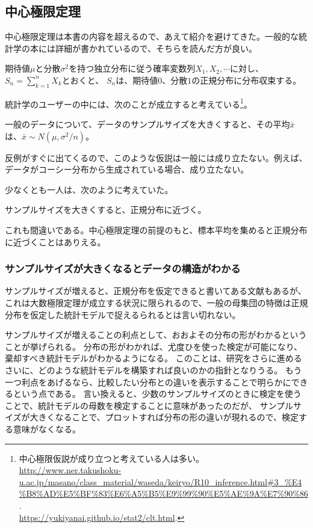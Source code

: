 

\subsection{中心極限定理}
中心極限定理は本書の内容を超えるので、あえて紹介を避けてきた。一般的な統計学の本には詳細が書かれているので、そちらを読んだ方が良い。
\begin{theo}[中心極限定理]
    期待値$\mu$と分散$\sigma^2$を持つ独立分布に従う確率変数列$X_1,X_2,\cdots$に対し、$S_n=\sum_{k=1}^nX_k$とおくと、
    $S_n$は、期待値$0$、分散$1$の正規分布に分布収束する。
\end{theo}

統計学のユーザーの中には、次のことが成立すると考えている\footnote{
    中心極限仮説が成り立つと考えている人は多い。
    \\ \url{http://www.ner.takushoku-u.ac.jp/masano/class_material/waseda/keiryo/R10_inference.html#3_%E4%B8%AD%E5%BF%83%E6%A5%B5%E9%99%90%E5%AE%9A%E7%90%86} .
    \\ \url{https://yukiyanai.github.io/stat2/clt.html}.
    }。
\begin{hypoth}[中心極限仮説]
    一般のデータについて、データのサンプルサイズを大きくすると、その平均$\bar{x}$は、$\bar{x}\sim N(\mu,\sigma^2/n)$。
\end{hypoth}
反例がすぐに出てくるので、このような仮説は一般には成り立たない。例えば、データがコーシー分布から生成されている場合、成り立たない。

少なくとも一人は、次のように考えていた。
\begin{hypoth}[中心極限仮説2]
    サンプルサイズを大きくすると、正規分布に近づく。
\end{hypoth}
これも間違いである。中心極限定理の前提のもと、標本平均を集めると正規分布に近づくことはありえる。


\subsubsection{ サンプルサイズが大きくなるとデータの構造がわかる}
サンプルサイズが増えると、正規分布を仮定できると書いてある文献もあるが、これは大数極限定理が成立する状況に限られるので、一般の母集団の特徴は正規分布を仮定した統計モデルで捉えるられるとは言い切れない。


サンプルサイズが増えることの利点として、おおよその分布の形がわかるということが挙げられる。
分布の形がわかれば、尤度ひを使った検定が可能になり、棄却すべき統計モデルがわかるようになる。
このことは、研究をさらに進めるさいに、どのような統計モデルを構築すれば良いのかの指針となりうる。
もう一つ利点をあげるなら、比較したい分布との違いを表示することで明らかにできるという点である。
言い換えると、少数のサンプルサイズのときに検定を使うことで、統計モデルの母数を検定することに意味があったのだが、
サンプルサイズが大きくなることで、プロットすれば分布の形の違いが現れるので、検定する意味がなくなる。
\fi

